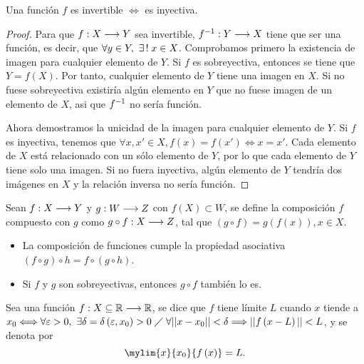 \begin{prop}
    Una función $f$ es invertible $\iff$ es inyectiva.
\end{prop}

\begin{proof}
    Para que $f : X\longrightarrow Y$ sea invertible, $f ^{-1} : Y\longrightarrow X$ tiene que ser una función, es decir,
    que $\forall y\in Y,\ \uexists x\in X$. Comprobamos primero la existencia de imagen para cualquier 
    elemento de $Y$. Si $f$ es sobreyectiva, entonces se tiene que $Y = f\left( X \right) $. Por tanto,
    cualquier elemento de $Y$ tiene una imagen en $X$. Si no fuese sobreyectiva existiría algún elemento en
    $Y$ que no fuese imagen de un elemento de $X$, asi que $f ^{-1}$ no sería función.

    Ahora demostramos la unicidad de la imagen para cualquier elemento de $Y$. Si $f$ es inyectiva, tenemos
    que $\forall x, x'\in X, f\left( x \right) = f\left( x' \right) \iff x = x'$. Cada elemento de $X$ está
    relacionado con un sólo elemento de $Y$, por lo que cada elemento de $Y$ tiene solo una imagen. Si no
    fuera inyectiva, algún elemento de $Y$ tendría dos imágenes en $X$ y la relación inversa no sería 
    función.
\end{proof}

\begin{defi}[Composición]
    Sean $f : X\longrightarrow Y$ y $g : W\longrightarrow Z$ con $f\left( X \right) \subset W$, se define la composición
    $f$ compuesto con $g$ como $g\circ f : X\longrightarrow Z$, tal que $\left( g\circ f \right) = g\left( f\left( x \right)  \right), x\in X$.
    \begin{itemize}[itemsep = -2pt]
        \item La composición de funciones cumple la propiedad asociativa $\left( f\circ g \right) \circ h = 
        f\circ\left( g\circ h \right) $.
    \item Si $f$ y $g$ son sobreyectivas, entonces $g\circ f$ también lo es.
    \end{itemize}
\end{defi}

\begin{defi}[Límite]
    Sea una función $f : X\subseteq{\ensuremath{\mathbb{R}}}\longrightarrow \mathbb{R}$, se dice que $f$ tiene límite $L$ cuando $x$ tiende a $x_0
    \Longleftrightarrow \forall\varepsilon > 0,\ \exists\delta = \delta\left( \varepsilon, x_0 \right) > 0\;\diagup\; \forall||x - x_0||
        < \delta\Longrightarrow ||f\left( x - L \right) || < L$, y se denota por
        \begin{equation}
            \mylim{x}{x_0}{f\left( x \right) } = L.
        \end{equation}
\end{defi}

